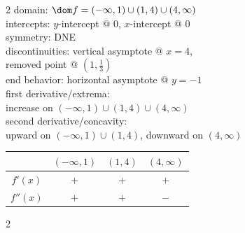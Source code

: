 \documentclass{book}
\begin{document}
\begin{appendices}
\begin{enumerate}[!HW!]
\begin{multicols}{2}
domain: $\dom f = (-\infty,1)\cup(1,4)\cup(4,\infty)$\\
intercepts: $y$-intercept @ 0, $x$-intercept @ 0\\
symmetry:  DNE \\ 
discontinuities: vertical asymptote @ $x=4$,\\ removed point @ $\left(1,\frac{1}{3}\right)$\\
end behavior: horizontal asymptote @ $y=-1$\\ 
first derivative/extrema:\\ increase on $(-\infty,1)\cup(1,4)\cup(4,\infty)$ \\
second derivative/concavity:\\ upward on $(-\infty,1)\cup (1,4)$, downward on $(4, \infty)$ \vspace{-15pt}
\begin{center}
\begin{tabular}{c|c|c|c}
 & $(-\infty, 1)$ & $(1, 4)$ & $(4,\infty)$ \\ \hline
$f'(x)$ & $+$ & $+$ & $+$ \\ 
$f''(x)$ & $+$ & $+$ & $-$\\ 
\end{tabular}
\end{center} 
\end{multicols}\pagebreak


\itemspade \mbox{}\vspace{-25pt}

\begin{multicols}{2}
\columnbreak


\end{multicols}
\end{enumerate}
\end{appendices}
\end{document}

